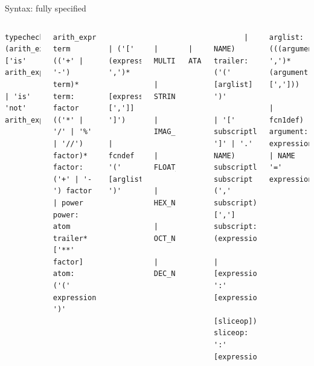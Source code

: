 \documentclass{beamer}
\begin{document}
\begin{frame}[fragile]{Syntax: fully specified}
\begin{columns}[t]
\tiny{}
\begin{verbatim}
typecheck: (arith_expr ['is' arith_expr
             | 'is' 'not' arith_expr])
\end{verbatim}
\vspace{-0.8 cm}
\begin{verbatim}
arith_expr: term (('+' | '-') term)*
term: factor (('*' | '/' | '%' | '//') factor)*
factor: ('+' | '-') factor | power
power: atom trailer* ['**' factor]
atom: ('(' expression ')'
\end{verbatim}
\vspace{-0.8 cm}
\begin{verbatim}
       | ('[' (expression ',')*
             [expression [',']] ']')
       | fcndef '(' [arglist] ')'
\end{verbatim}
\vspace{-0.8 cm}
\begin{verbatim}
       | MULTILINESTRING
       | STRING
       | IMAG_NUMBER
       | FLOAT_NUMBER
       | HEX_NUMBER
       | OCT_NUMBER
       | DEC_NUMBER
\end{verbatim}
\vspace{-0.8 cm}
\begin{verbatim}
       | ATARG
\end{verbatim}
\vspace{-0.8 cm}
\begin{verbatim}
       | NAME)
trailer: ('(' [arglist] ')'
           | '[' subscriptlist ']' | '.' NAME)
subscriptlist: subscript (',' subscript)* [',']
subscript: (expression
           | [expression] ':' [expression]
             [sliceop])
sliceop: ':' [expression]
\end{verbatim}
\vspace{-0.8 cm}
\begin{verbatim}
arglist: (((argument ',')* (argument [',']))
           | fcn1def)
argument: expression | NAME '=' expression
\end{verbatim}
\end{columns}
\end{frame}
\end{document}

